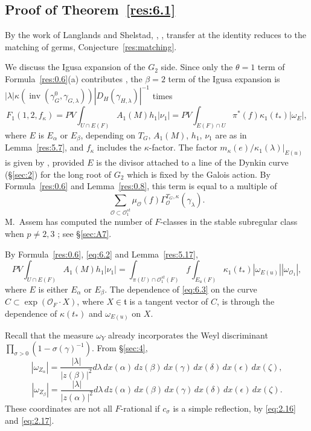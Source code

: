 \documentclass[12pt,letterpaper]{amsart}
\theoremstyle{plain}
\theoremstyle{definition}
\theoremstyle{remark}
\theoremstyle{definition}
\newcommand{\OF}{\mathcal{O}_F}
\DeclareMathOperator{\inv}{inv}
\begin{document}
\subsection*{Proof of \texorpdfstring{Theorem~\ref{res:6.1}}{Theorem 6.1}}

By the work of Langlands and Shelstad, \cite{LS87}, \cite{LS90}, transfer
at the identity reduces to the matching of germs, Conjecture~\ref{res:matching}.

We discuss the Igusa expansion of the $G_2$ side.
Since only the $\theta=1$ term of Formula~\ref{res:0.6}(a)
contributes \cite[Ch.~VI, \S2]{Ha92a},
the $\beta=2$ term of the Igusa expansion is
$|\lambda|\kappa(\inv(\gamma_G^0,\gamma_{G,\lambda}))
|D_H(\gamma_{H,\lambda})|^{-1}$
times
\begin{equation}\tag{6.2}\label{eq:6.2}
F_1(1,2,f_\kappa)=
PV\int_{U\cap E(F)}A_1(M)h_1|\nu_1|=
PV\int_{E(F)\cap U}\pi^*(f)\kappa_1(t_*)|\omega_E|,
\end{equation}
where $E$ is $E_\alpha$ or $E_\beta$, depending on $T_G$,
$A_1(M)$, $h_1$, $\nu_1$ are as in Lemma~\ref{res:5.7},
and $f_\kappa$ includes the $\kappa$-factor. The factor
$m_\kappa(e)/\kappa_1(\lambda)|_{E(u)}$ is given by
\cite[Ch.~VI, \S2 and Proposition~3.2]{Ha92a}, provided $E$ is the divisor
attached to a line of the Dynkin curve (\S\ref{sec:2}) for the long root
of $G_2$ which is fixed by the Galois action.
By Formula~\ref{res:0.6} and Lemma~\ref{res:0.8},
this term is equal to a multiple of
\[
\sum_{{\mathcal O}\subset {\mathcal O}_1^{st}}
\mu_{\mathcal O} (f)\Gamma^{T_G,\kappa}_{\mathcal O}(\gamma_\lambda).
\]
M.~Assem has computed the number of $F$-classes in the
stable subregular class when $p\not= 2,3$ \cite{As98}; see \S\ref{sec:A7}.

By Formula~\ref{res:0.6}, \eqref{eq:6.2} and Lemma~\ref{res:5.17},
\begin{equation}\tag{6.3}\label{eq:6.3}
PV\int_{U\cap E(F)}A_1(M)h_1|\nu_1|
=\int_{\pi(U)\cap {\mathcal O}_1^{st}(F)}f\int_{E_u(F)}
\kappa_1(t_*)|\omega_{E(u)}||\omega_{{\mathcal O}_1}|,
\end{equation}
where $E$ is either $E_\alpha$ or $E_\beta$.
The dependence of \eqref{eq:6.3} on the curve
$C\subset \exp(\OF\cdot X)$, where $X\in {\mathfrak t}$ is a tangent vector
of $C$, is through the dependence of $\kappa(t_*)$ and $\omega_{E(u)}$
on $X$.

Recall \cite[Lemma~2.12]{La83} that the measure $\omega_Y$ already incorporates
the Weyl discriminant $\prod_{\sigma >0}(1-\sigma(\gamma)^{-1})$.
From \S\ref{sec:4},
\[
|\omega_{Z_\alpha}|=
\frac{|\lambda|}{|z(\beta)|^2}d\lambda\, dx(\alpha)\, dz(\beta)\,dx(\gamma)\,
dx(\delta)\,dx(\epsilon)\,dx(\zeta),
\]
\[
|\omega_{Z_\beta}|=
\frac{|\lambda|}{|z(\alpha)|^2}d\lambda\, dz(\alpha)\, dx(\beta)\,dx(\gamma)\,
dx(\delta)\,dx(\epsilon)\,dx(\zeta).
\]
These coordinates are not all $F$-rational if $c_\sigma$ is a
simple reflection, by \eqref{eq:2.16} and \eqref{eq:2.17}.
\end{document}
